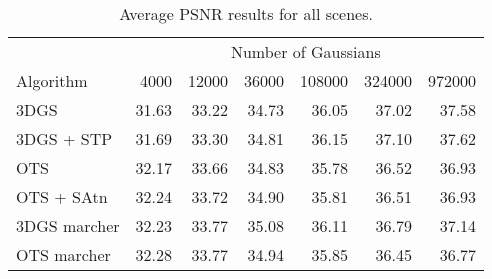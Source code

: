 \begin{table}[h!]
\centering
\caption{Average PSNR results for all scenes.}
\label{tab:psnr_avg}
\begin{tabular}{lrrrrrr}
\toprule
& \multicolumn{6}{c}{Number of Gaussians} \\
Algorithm & 4000 & 12000 & 36000 & 108000 & 324000 & 972000 \\

\midrule
3DGS            & 31.63 & 33.22 & 34.73 & 36.05 & 37.02 & 37.58 \\
3DGS + STP      & 31.69 & 33.30 & 34.81 & 36.15 & 37.10 & 37.62 \\
OTS             & 32.17 & 33.66 & 34.83 & 35.78 & 36.52 & 36.93 \\
OTS + SAtn      & 32.24 & 33.72 & 34.90 & 35.81 & 36.51 & 36.93 \\
3DGS marcher    & 32.23 & 33.77 & 35.08 & 36.11 & 36.79 & 37.14 \\
OTS marcher     & 32.28 & 33.77 & 34.94 & 35.85 & 36.45 & 36.77 \\
\bottomrule
\end{tabular}
\end{table}
